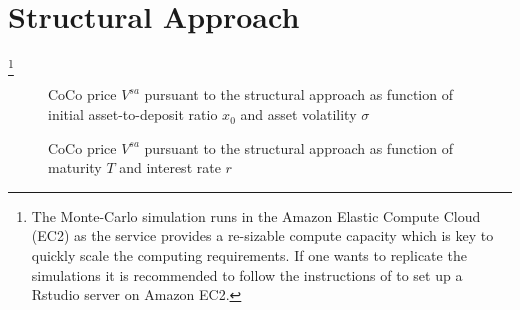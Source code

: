 \section{Structural Approach}

\footnote{The Monte-Carlo simulation runs in the Amazon Elastic Compute Cloud (EC2) as the service provides a re-sizable compute capacity which is key to quickly scale the computing requirements. If one wants to replicate the simulations it is recommended to follow the instructions of \citet{amazonrstudio} to set up a Rstudio server on Amazon EC2.}
\begin{figure}[H]
\centering
    \caption[CoCo price $V^{sa}$ as function of asset-to-deposit ratio and asset volatility]{CoCo price $V^{sa}$ pursuant to the structural approach \citep{pennacchi2010structural} as function of initial asset-to-deposit ratio $x_0$ and asset volatility $\sigma$}
  \end{figure}

\begin{figure}[H]
\centering
    \caption[CoCo price $V^{sa}$ as function of asset-to-deposit ratio and asset volatility]{CoCo price $V^{sa}$ pursuant to the structural approach \citep{pennacchi2010structural} as function of maturity $T$ and interest rate $r$}
  \end{figure}

